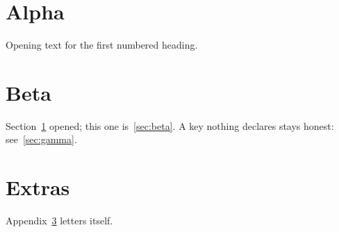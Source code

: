 \documentclass{article}
\begin{document}
\section{Alpha}
\label{sec:alpha}
Opening text for the first numbered heading.

\section{Beta}
\label{sec:beta}
Section~\ref{sec:alpha} opened; this one is~\eqref{sec:beta}.
A key nothing declares stays honest: see~\ref{sec:gamma}.

\appendix
\section{Extras}
\label{sec:extras}
Appendix~\ref{sec:extras} letters itself.
\end{document}
